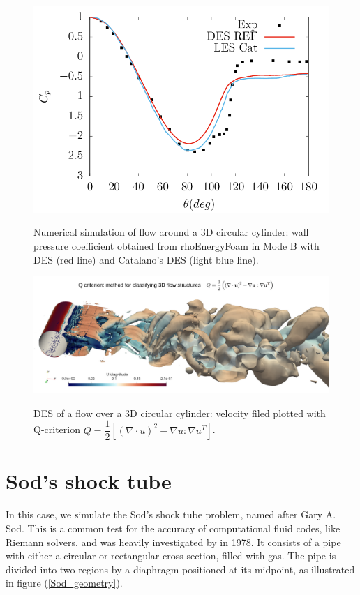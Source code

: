 \documentclass[a5paper]{sapthesis}
\begin{document}
	\begin{figure}[h]
		\begin{center}
			{\includegraphics[width=0.56\linewidth]{Figures/pressure_coefficient_DES}}  
			\caption[Pressure coefficients for the DES of the 3D cylinder]{Numerical simulation of ﬂow around a 3D circular cylinder: wall pressure coefficient obtained from rhoEnergyFoam in Mode B with DES (red line) and Catalano's DES (light blue line).}
			\label{Cp_Cylinder_DES}
		\end{center}
	\end{figure}
	
	\begin{figure}[t]
		\begin{center}
			{\includegraphics[width=1\linewidth]{Figures/Des_cylinder}}
			\caption[Velocity representation through Q-criterion of a DES of the circular cylinder]{DES of a flow over a 3D circular cylinder: velocity filed plotted with Q-criterion $Q = \dfrac{1}{2} [(\nabla \cdot u)^2 - \nabla u : \nabla u^T]$.}
			\label{Des_Cylinder}
		\end{center}
	\end{figure}
	\newpage
	\section{Sod's shock tube}
	In this case, we simulate the Sod's shock tube problem, named after Gary A. Sod. This is a common test for the accuracy of computational fluid codes, like Riemann solvers, and was heavily investigated by \citet{Sod19781} in 1978. It consists of a pipe with either a circular or rectangular cross-section, filled with gas. The pipe is divided into two regions by a diaphragm positioned at its midpoint, as illustrated in figure (\ref{Sod_geometry}). 
		
\end{document}
